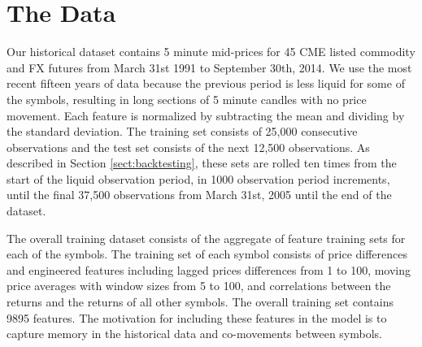 \documentclass{article}
\begin{document}
% 

\section{The Data} \label{sect:data}
Our historical dataset contains 5 minute mid-prices  for 45 CME listed commodity and FX futures from March 31st 1991 to September 30th, 2014.  We use the most recent fifteen years of data because the previous period is less liquid for some of the symbols, resulting in long sections of 5 minute candles with no price movement. Each feature is normalized by subtracting the mean and dividing by the standard deviation. The training set consists of 25,000 consecutive observations and the test set consists of the next 12,500 observations. As described in Section \ref{sect:backtesting}, these sets are rolled ten times from the start of the liquid observation period, in 1000 observation period increments, until the final 37,500 observations from March 31st, 2005 until the end of the dataset.

The overall training dataset consists of the aggregate of feature training sets for each of the symbols. The training set of each symbol consists of price differences and engineered features including lagged prices differences from 1 to 100, moving price averages with window sizes from 5 to 100, and correlations between the returns and the returns of all other symbols. The overall training set contains 9895 features. The motivation for including these features in the model is to capture memory in the historical data and co-movements between symbols.
\end{document}
